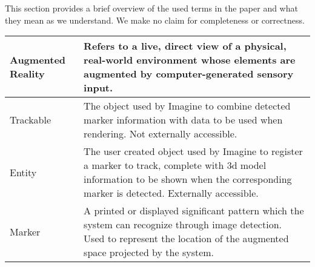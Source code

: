 This section provides a brief overview of the used terms in the paper and what they mean as we understand.
We make no claim for completeness or correctness.

\begin{tabulary}{\textwidth}{L|L}
Augmented Reality & Refers to a live, direct view of a physical, real-world environment whose elements are augmented by computer-generated sensory input\protect \cite{ardef}. \\
\hline
Trackable & The object used by Imagine to combine detected marker information with data to be used when rendering. Not externally accessible.\\
\hline
Entity & The user created object used by Imagine to register a marker to track, complete with 3d model information to be shown when the corresponding marker is detected. Externally accessible.\\
\hline
Marker & A printed or displayed significant pattern which the system can recognize through image detection. Used to represent the location of the augmented space projected by the system. \\
\end{tabulary}
